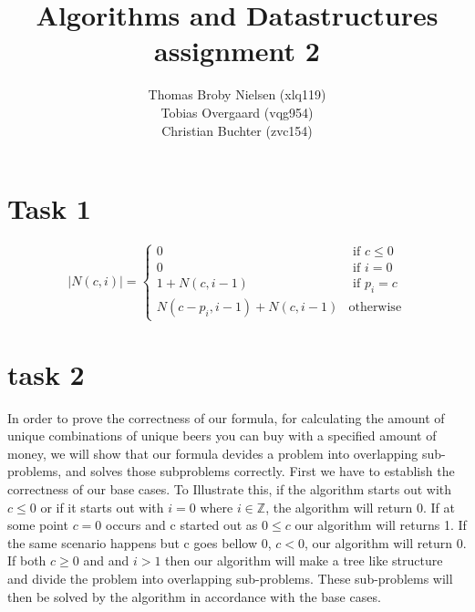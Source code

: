 \documentclass[12pt]{article}
\title{Algorithms and Datastructures assignment 2}
\author{Thomas Broby Nielsen (xlq119)\\ Tobias Overgaard (vqg954)\\ Christian Buchter (zvc154)}
\begin{document}
\maketitle

\tableofcontents

\pagebreak
\section{Task 1}
$$
|N(c,i)| = \left\{ \begin{array}{rl}
0 &\mbox{ if $c \leq 0$} \\
0 &\mbox{ if $i=0$} \\
1+N(c,i-1) &\mbox{ if $p_i=c$}\\
N(c-p_i,i-1)+N(c,i-1) &\mbox{otherwise}
\end{array} \right.
$$

\section{task 2}
In order to prove the correctness of our formula, for calculating the amount of unique combinations of unique beers you can buy with a specified amount of money, we will show that our formula devides a problem into overlapping sub-problems, and solves those subproblems correctly. 
First we have to establish the correctness of our base cases.
To Illustrate this, if the algorithm starts out with $c \leq 0$ or if it starts out with $i = 0$ where $i \in \mathbb{Z}$, the algorithm will return 0. If at some point $c = 0$ occurs and c started out as $0 \leq c$  our algorithm will returns 1. If the same scenario happens but c goes bellow 0, $c < 0$, our algorithm will return 0. If both $c \geq  0$ and and $i > 1$ then our algorithm will make a tree like structure and divide the problem into  overlapping sub-problems. These sub-problems will then be solved by the algorithm in accordance with the base cases.   

 

\newpage
\end{document}
